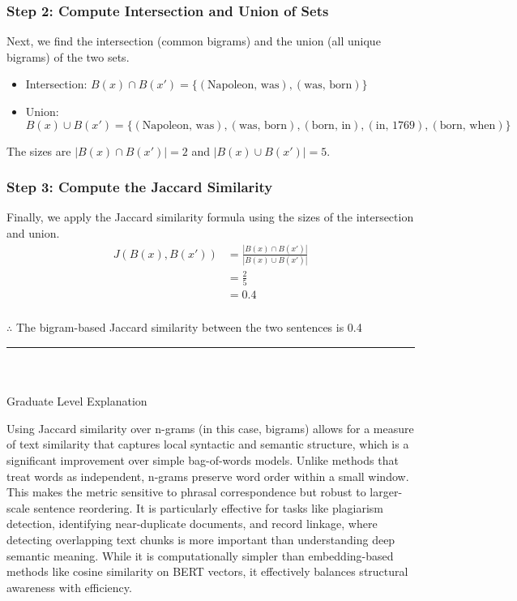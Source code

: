 \documentclass{article}
\begin{document}
\subsubsection*{Step 2: Compute Intersection and Union of Sets}
\parbox{\textwidth}{
Next, we find the intersection (common bigrams) and the union (all unique bigrams) of the two sets.
\begin{itemize}
    \item Intersection: $B(x) \cap B(x') = \{(\text{Napoleon, was}), (\text{was, born})\}$
    \item Union: $B(x) \cup B(x') = \{(\text{Napoleon, was}), (\text{was, born}), (\text{born, in}), (\text{in, 1769}), (\text{born, when})\}$
\end{itemize}
The sizes are $|B(x) \cap B(x')| = 2$ and $|B(x) \cup B(x')| = 5$.
}

\subsubsection*{Step 3: Compute the Jaccard Similarity}
\parbox{\textwidth}{
Finally, we apply the Jaccard similarity formula using the sizes of the intersection and union.
\begin{align*}
    J(B(x), B(x')) &= \frac{|B(x) \cap B(x')|}{|B(x) \cup B(x')|} \\
                  &= \frac{2}{5} \\
                  &= 0.4
\end{align*}
}

\subsubsection*{\normalfont}{$\therefore$ The bigram-based Jaccard similarity between the two sentences is 0.4}

\noindent\rule{\textwidth}{0.4pt}\\

\newpage

\subsubsection*{\normalfont}{Graduate Level Explanation}

\parbox{\textwidth}{
Using Jaccard similarity over n-grams (in this case, bigrams) allows for a measure of text similarity that captures local syntactic and semantic structure, which is a significant improvement over simple bag-of-words models. Unlike methods that treat words as independent, n-grams preserve word order within a small window. This makes the metric sensitive to phrasal correspondence but robust to larger-scale sentence reordering. It is particularly effective for tasks like plagiarism detection, identifying near-duplicate documents, and record linkage, where detecting overlapping text chunks is more important than understanding deep semantic meaning. While it is computationally simpler than embedding-based methods like cosine similarity on BERT vectors, it effectively balances structural awareness with efficiency.
}
\end{document}
